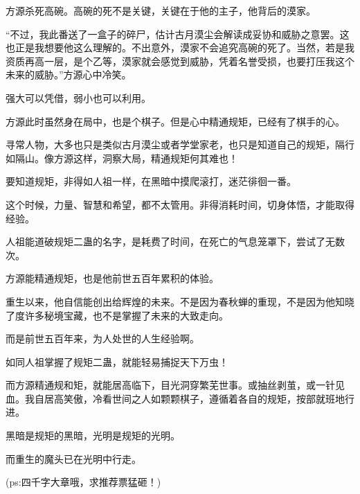 \begin{this_body}
方源杀死高碗。高碗的死不是关键，关键在于他的主子，他背后的漠家。

“不过，我此番送了一盒子的碎尸，估计古月漠尘会解读成妥协和威胁之意罢。这也正是我想要他这么理解的。不出意外，漠家不会追究高碗的死了。当然，若是我资质再高一层，是个乙等，漠家就会感觉到威胁，凭着名誉受损，也要打压我这个未来的威胁。”方源心中冷笑。

强大可以凭借，弱小也可以利用。

方源此时虽然身在局中，也是个棋子。但是心中精通规矩，已经有了棋手的心。

寻常人物，大多也只是类似古月漠尘或者学堂家老，也只是知道自己的规矩，隔行如隔山。像方源这样，洞察大局，精通规矩何其难也！

要知道规矩，非得如人祖一样，在黑暗中摸爬滚打，迷茫徘徊一番。

这个时候，力量、智慧和希望，都不太管用。非得消耗时间，切身体悟，才能取得经验。

人祖能道破规矩二蛊的名字，是耗费了时间，在死亡的气息笼罩下，尝试了无数次。

方源能精通规矩，也是他前世五百年累积的体验。

重生以来，他自信能创出给辉煌的未来。不是因为春秋蝉的重现，不是因为他知晓了度许多秘境宝藏，也不是掌握了未来的大致走向。

而是前世五百年来，为人处世的人生经验啊。

如同人祖掌握了规矩二蛊，就能轻易捕捉天下万虫！

而方源精通规和矩，就能居高临下，目光洞穿繁芜世事。或抽丝剥茧，或一针见血。我自居高笑傲，冷看世间之人如颗颗棋子，遵循着各自的规矩，按部就班地行进。

黑暗是规矩的黑暗，光明是规矩的光明。

而重生的魔头已在光明中行走。

(ps:四千字大章哦，求推荐票猛砸！)

\end{this_body}


